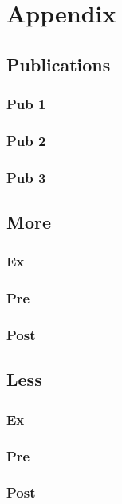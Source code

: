 

\appendix
{}
\renewcommand{\thesection}{\Alph{section}}

\chapter*{Appendix}
\section{Publications}
\subsection{Pub 1}

\subsection{Pub 2}

\subsection{Pub 3}

\section{More}
\subsection{Ex }

\subsection{Pre}

\subsection{Post}

\section{Less}
\subsection{Ex }

\subsection{Pre}

\subsection{Post}

